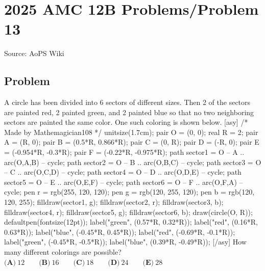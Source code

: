 \documentclass[12pt]{article}
\begin{document}
\section*{{2025 AMC 12B Problems/Problem 13}}
Source: AoPS Wiki

\subsection*{Problem}
A circle has been divided into 6 sectors of different sizes. Then 2 of the sectors are painted red, 2 painted green, and 2 painted blue so that no two neighboring sectors are painted the same color. One such coloring is shown below. [asy] /* Made by Mathemagician108 */ unitsize(1.7cm); pair O = (0, 0); real R = 2; pair A = (R, 0); pair B = (0.5*R, 0.866*R); pair C = (0, R); pair D = (-R, 0); pair E = (-0.954*R, -0.3*R); pair F = (-0.22*R, -0.975*R); path sector1 = O -- A .. arc(O,A,B) -- cycle; path sector2 = O -- B .. arc(O,B,C) -- cycle; path sector3 = O -- C .. arc(O,C,D) -- cycle; path sector4 = O -- D .. arc(O,D,E) -- cycle; path sector5 = O -- E .. arc(O,E,F) -- cycle; path sector6 = O -- F .. arc(O,F,A) -- cycle; pen r = rgb(255, 120, 120); pen g = rgb(120, 255, 120); pen b = rgb(120, 120, 255); filldraw(sector1, g); filldraw(sector2, r); filldraw(sector3, b); filldraw(sector4, r); filldraw(sector5, g); filldraw(sector6, b); draw(circle(O, R)); defaultpen(fontsize(12pt)); label("green", (0.57*R, 0.32*R)); label("red", (0.16*R, 0.63*R)); label("blue", (-0.45*R, 0.45*R)); label("red", (-0.69*R, -0.1*R)); label("green", (-0.45*R, -0.5*R)); label("blue", (0.39*R, -0.49*R)); [/asy] How many different colorings are possible? $\textbf{(A)}~12\qquad\textbf{(B)}~16\qquad\textbf{(C)}~18\qquad\textbf{(D)}~24\qquad\textbf{(E)}~28$
\end{document}

